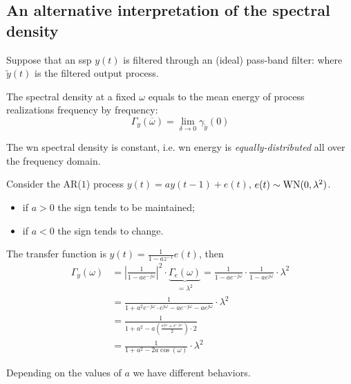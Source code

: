 \subsection{An alternative interpretation of the spectral density}
Suppose that an \gls{ssp} $y(t)$ is filtered through an (ideal) pass-band filter:
where $\tilde{y}(t)$ is the filtered output process.
\begin{thm}
	The spectral density at a fixed $\omega$ equals to the mean energy of process realizations frequency by frequency:
	\[
		\Gamma _{y}(\overline{\omega})=\lim_{\delta  \to 0} \gamma _{\tilde{y}}(0)
	\]
\end{thm}

\begin{exa}
The \gls{wn} spectral density is constant, i.e. \gls{wn} energy is \emph{equally-distributed} all over the frequency domain.
\end{exa}

\begin{figure}[htpb]
	\centering
\end{figure}
\FloatBarrier

\begin{exa}
Consider the AR($1$) process $y(t)=ay(t-1)+e(t)$, $e(t)\sim \operatorname{WN}(0,\lambda^2)$.
\begin{itemize}
	\item if $a>0$ the sign tends to be maintained;
	\item if $a<0$ the sign tends to change.
\end{itemize}
The transfer function is $y(t)=\frac{1}{1-az^{-1} }e(t)$, then
\begin{align*}
	\Gamma _{y}(\omega )&=\left|\frac{1}{1-ae^{-j\omega } }\right|^2 \cdot\underbrace{\Gamma _{e}(\omega )}_{=\lambda^2 } = \frac{1}{1-ae^{-j\omega}}\cdot\frac{1}{1-ae^{j\omega}} \cdot\lambda^2\\
	&=\frac{1}{1+a^2 e^{-j\omega }\cdot e^{j\omega }-ae^{-j\omega}-ae^{j\omega}} \cdot \lambda^2\\
	&=\frac{1}{1+a^2 -a\left( \frac{e^{j\omega}+e^{-j\omega}}{2} \right)\cdot 2}\\
	&=\frac{1}{1+a^2-2a\cos (\omega)} \cdot\lambda^2
\end{align*}
\end{exa}
Depending on the values of $a$ we have different behaviors.

